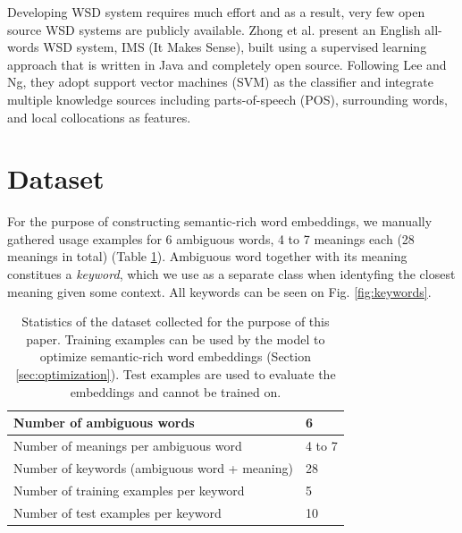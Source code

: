 \documentclass{llncs}
\begin{document}
Developing WSD system requires much effort and as a result, very few open source WSD systems are publicly available. Zhong et al.\cite{itmakessense} present an English all-words WSD system, IMS (It Makes Sense), built using a supervised learning approach that is written in Java and completely open source. Following Lee and Ng\cite{SVMtoWSD}, they adopt support vector machines (SVM) as the classifier and integrate multiple knowledge sources including parts-of-speech (POS), surrounding words, and local collocations as features.

\section{Dataset}
\label{sec:dataset}

For the purpose of constructing semantic-rich word embeddings, we manually gathered usage examples for 6 ambiguous words, 4 to 7 meanings each (28 meanings in total) (Table \ref{table:dataset}).
Ambiguous word together with its meaning constitues a \textit{keyword}, which we use as a separate class when identyfing the closest meaning given some context.
All keywords can be seen on Fig. \ref{fig:keywords}.

\begin{table}
\centering
    \begin{tabular}{ | m{7.5cm} | m{1cm} | }
        \hline
        Number of ambiguous words & 6 \\
        \hline
        Number of meanings per ambiguous word & 4 to 7 \\
        \hline
        Number of keywords (ambiguous word + meaning) & 28 \\
    \hline
    \hline
    Number of training examples per keyword & 5 \\
    \hline
    Number of test examples per keyword & 10 \\
    \hline
    \end{tabular}
    \caption{Statistics of the dataset collected for the purpose of this paper. Training examples can be used by the model to optimize semantic-rich word embeddings (Section \ref{sec:optimization}). Test examples are used to evaluate the embeddings and cannot be trained on.}
    \label{table:dataset}
\end{table}
\end{document}
